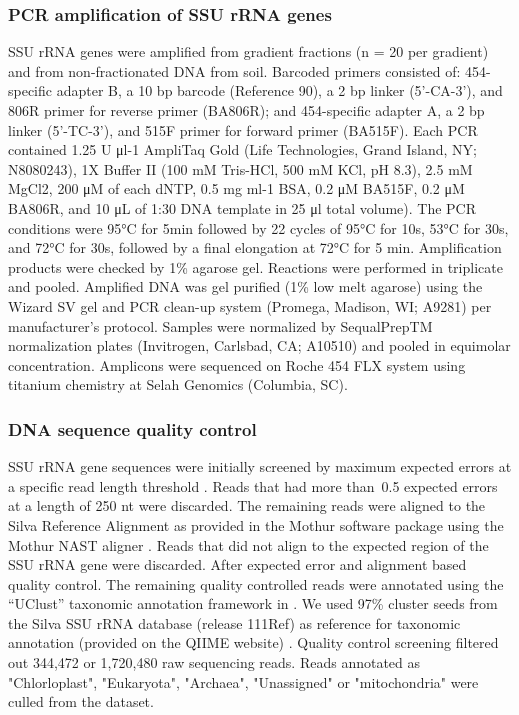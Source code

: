 \documentclass{article}
\begin{document}
\subsubsection{PCR amplification of SSU rRNA genes} 
SSU rRNA genes were amplified from gradient fractions (n = 20 per
gradient) and from non-fractionated DNA from soil. Barcoded primers
consisted of: 454-specific adapter B, a 10 bp barcode (Reference
90), a 2 bp linker (5’-CA-3’), and 806R primer for reverse primer
(BA806R); and 454-specific adapter A, a 2 bp linker (5’-TC-3’), and 515F
primer for forward primer (BA515F). Each PCR contained 1.25 U μl-1
AmpliTaq Gold (Life Technologies, Grand Island, NY; N8080243), 1X Buffer
II (100 mM Tris-HCl, 500 mM KCl, pH
8.3), 2.5 mM MgCl2, 200 μM of each dNTP, 0.5 mg ml-1 BSA, 0.2 μM BA515F, 0.2 μM
BA806R, and 10 μL of 1:30 DNA template in 25 μl total volume). The PCR
conditions were 95°C for 5min followed by 22 cycles of 95°C for 10s, 53°C for
30s, and 72°C for 30s, followed by a final elongation at 72°C for 5 min.
Amplification products were checked by 1\% agarose gel. Reactions were
performed in triplicate and pooled. Amplified DNA was gel purified (1\% low
melt agarose) using the Wizard SV gel and PCR clean-up system (Promega,
Madison, WI; A9281) per manufacturer’s protocol. Samples were normalized by
SequalPrepTM normalization plates (Invitrogen, Carlsbad, CA; A10510) and pooled
in equimolar concentration. Amplicons were sequenced on Roche 454 FLX system
using titanium chemistry at Selah Genomics (Columbia, SC).

\subsubsection{DNA sequence quality control}
SSU rRNA gene sequences were initially screened by maximum expected errors
at a specific read length threshold \citep{edgar2013}. Reads that had more
than~0.5 expected errors at a length of 250 nt were discarded. The
remaining reads were aligned to the Silva Reference Alignment as provided
in the Mothur software package using the Mothur NAST aligner
\citep{DeSantis2005,schloss2009}. Reads that did not align to the expected
region of the SSU rRNA gene were discarded. After expected error and
alignment based quality control. The remaining quality controlled reads
were annotated using the “UClust” taxonomic annotation framework in
\citep{caporaso2010,edgar2010}. We used 97\% cluster seeds from the Silva
SSU rRNA database (release 111Ref) \citep{quast2013} as reference for
taxonomic annotation (provided on the QIIME website) \citep{quast2013}.
Quality control screening filtered out 344,472 or 1,720,480 raw sequencing
reads. Reads annotated as "Chlorloplast", "Eukaryota", "Archaea",
"Unassigned" or "mitochondria" were culled from the dataset. 
\end{document}

